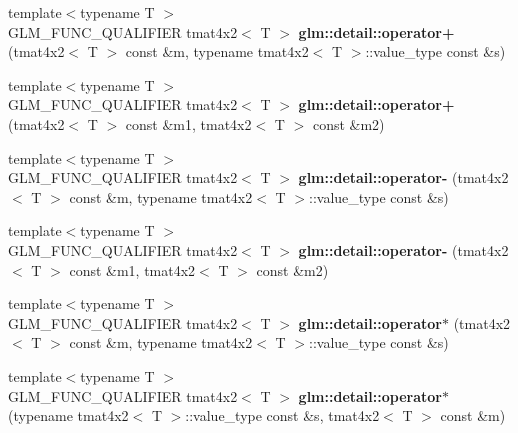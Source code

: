 \begin{DoxyCompactItemize}
\item 
\hypertarget{namespaceglm_1_1detail_ae54e3cfbc64edbac080b6f07b2c3d0a9}{{\footnotesize template$<$typename T $>$ }\\G\-L\-M\-\_\-\-F\-U\-N\-C\-\_\-\-Q\-U\-A\-L\-I\-F\-I\-E\-R tmat4x2$<$ T $>$ {\bfseries glm\-::detail\-::operator+} (tmat4x2$<$ T $>$ const \&m, typename tmat4x2$<$ T $>$\-::value\-\_\-type const \&s)}\label{namespaceglm_1_1detail_ae54e3cfbc64edbac080b6f07b2c3d0a9}

\item 
\hypertarget{namespaceglm_1_1detail_a4e7eaef749bb4c383065c7738772a6d7}{{\footnotesize template$<$typename T $>$ }\\G\-L\-M\-\_\-\-F\-U\-N\-C\-\_\-\-Q\-U\-A\-L\-I\-F\-I\-E\-R tmat4x2$<$ T $>$ {\bfseries glm\-::detail\-::operator+} (tmat4x2$<$ T $>$ const \&m1, tmat4x2$<$ T $>$ const \&m2)}\label{namespaceglm_1_1detail_a4e7eaef749bb4c383065c7738772a6d7}

\item 
\hypertarget{namespaceglm_1_1detail_a49239cfb38e43d7728c0fb79f51bf57e}{{\footnotesize template$<$typename T $>$ }\\G\-L\-M\-\_\-\-F\-U\-N\-C\-\_\-\-Q\-U\-A\-L\-I\-F\-I\-E\-R tmat4x2$<$ T $>$ {\bfseries glm\-::detail\-::operator-\/} (tmat4x2$<$ T $>$ const \&m, typename tmat4x2$<$ T $>$\-::value\-\_\-type const \&s)}\label{namespaceglm_1_1detail_a49239cfb38e43d7728c0fb79f51bf57e}

\item 
\hypertarget{namespaceglm_1_1detail_aa1924521c994e049c51e66d103fbd649}{{\footnotesize template$<$typename T $>$ }\\G\-L\-M\-\_\-\-F\-U\-N\-C\-\_\-\-Q\-U\-A\-L\-I\-F\-I\-E\-R tmat4x2$<$ T $>$ {\bfseries glm\-::detail\-::operator-\/} (tmat4x2$<$ T $>$ const \&m1, tmat4x2$<$ T $>$ const \&m2)}\label{namespaceglm_1_1detail_aa1924521c994e049c51e66d103fbd649}

\item 
\hypertarget{namespaceglm_1_1detail_a3742be653e7749b1f5d08b2f1879b8dd}{{\footnotesize template$<$typename T $>$ }\\G\-L\-M\-\_\-\-F\-U\-N\-C\-\_\-\-Q\-U\-A\-L\-I\-F\-I\-E\-R tmat4x2$<$ T $>$ {\bfseries glm\-::detail\-::operator$\ast$} (tmat4x2$<$ T $>$ const \&m, typename tmat4x2$<$ T $>$\-::value\-\_\-type const \&s)}\label{namespaceglm_1_1detail_a3742be653e7749b1f5d08b2f1879b8dd}

\item 
\hypertarget{namespaceglm_1_1detail_a01d02f917269ffad54065719f9700d95}{{\footnotesize template$<$typename T $>$ }\\G\-L\-M\-\_\-\-F\-U\-N\-C\-\_\-\-Q\-U\-A\-L\-I\-F\-I\-E\-R tmat4x2$<$ T $>$ {\bfseries glm\-::detail\-::operator$\ast$} (typename tmat4x2$<$ T $>$\-::value\-\_\-type const \&s, tmat4x2$<$ T $>$ const \&m)}\label{namespaceglm_1_1detail_a01d02f917269ffad54065719f9700d95}


\end{DoxyCompactItemize}
